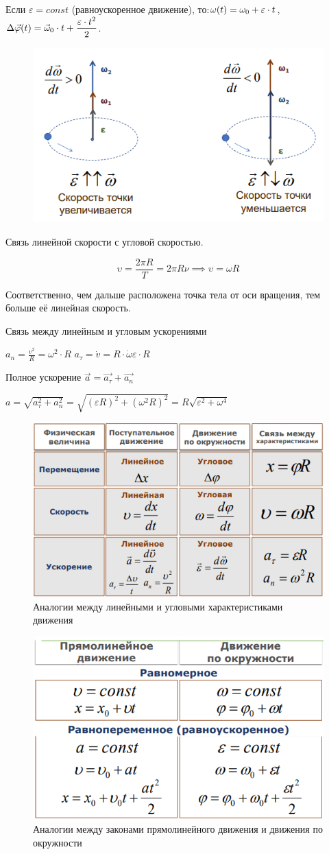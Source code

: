Если $\varepsilon=const$ (равноускоренное движение), то:$\displaystyle\\ \omega(t)=\omega_0+\varepsilon\cdot t$, $\displaystyle\\\Delta\vec\varphi(t)=\vec\omega_0\cdot t+\frac{\varepsilon\cdot t^2}{2}$.

\begin{figure}[h]
    \centering
    \includegraphics[width=0.5\linewidth]{imgs/q2i2.png}
\end{figure}

\begin{remark}
    Связь линейной скорости с угловой скоростью.

    $$
    \upsilon=\frac{2\pi R}{T}=2\pi R\nu \implies \upsilon=\omega R
    $$

    Соответственно, чем дальше расположена точка тела от оси вращения, тем больше её линейная скорость.
\end{remark}

\begin{remark}
    Связь между линейным и угловым ускорениями

    $a_n = \frac{v^2}{R} = \omega^2\cdot R$
    $a_\tau = \dot{v} = R \cdot \dot{\omega} \varepsilon \cdot R$

    Полное ускорение $\vec{a} = \vec{a_\tau} + \vec{a_n}$

    $a = \sqrt{a_\tau^2 + a_n^2} = \sqrt{(\varepsilon R)^2 + (\omega^2 R)^2} = R\sqrt{\varepsilon^2+\omega^4}$
\end{remark}

\begin{figure}[h]
    \centering
    \includegraphics[width=0.5\linewidth]{imgs/q2i3.png}
    \caption{Аналогии между линейными и угловыми характеристиками движения}
\end{figure}

\begin{figure}[h]
    \centering
    \includegraphics[width=0.5\linewidth]{imgs/q2i4.png}
    \caption{Аналогии между законами прямолинейного движения и движения по окружности}
\end{figure}
